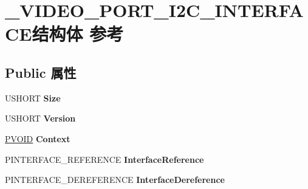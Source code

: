 \hypertarget{struct___v_i_d_e_o___p_o_r_t___i2_c___i_n_t_e_r_f_a_c_e}{}\section{\+\_\+\+V\+I\+D\+E\+O\+\_\+\+P\+O\+R\+T\+\_\+\+I2\+C\+\_\+\+I\+N\+T\+E\+R\+F\+A\+C\+E结构体 参考}
\label{struct___v_i_d_e_o___p_o_r_t___i2_c___i_n_t_e_r_f_a_c_e}
\subsection*{Public 属性}
\begin{DoxyCompactItemize}
\item 
\mbox{\label{struct___v_i_d_e_o___p_o_r_t___i2_c___i_n_t_e_r_f_a_c_e_a656c3b649efa2d68dd54d0d490036aff}} 
U\+S\+H\+O\+RT {\bfseries Size}
\item 
\mbox{\label{struct___v_i_d_e_o___p_o_r_t___i2_c___i_n_t_e_r_f_a_c_e_a709589974d2b2ddb2d1f87fef1fdf10c}} 
U\+S\+H\+O\+RT {\bfseries Version}
\item 
\mbox{\label{struct___v_i_d_e_o___p_o_r_t___i2_c___i_n_t_e_r_f_a_c_e_a8b0cfa40a2acd4bf2521ee721008b26d}} 
\hyperlink{interfacevoid}{P\+V\+O\+ID} {\bfseries Context}
\item 
\mbox{\label{struct___v_i_d_e_o___p_o_r_t___i2_c___i_n_t_e_r_f_a_c_e_a8b3eeab224b2f01cb66978eb9246ff73}} 
P\+I\+N\+T\+E\+R\+F\+A\+C\+E\+\_\+\+R\+E\+F\+E\+R\+E\+N\+CE {\bfseries Interface\+Reference}
\item 
\mbox{\label{struct___v_i_d_e_o___p_o_r_t___i2_c___i_n_t_e_r_f_a_c_e_adeaacc87b21cc290cc05da149a00595b}} 
P\+I\+N\+T\+E\+R\+F\+A\+C\+E\+\_\+\+D\+E\+R\+E\+F\+E\+R\+E\+N\+CE {\bfseries Interface\+Dereference}
\item 
\mbox{\label{struct___v_i_d_e_o___p_o_r_t___i2_c___i_n_t_e_r_f_a_c_e_a8028f5f78e41a5d111be031b5c22c4e8}} 

\end{DoxyCompactItemize}
